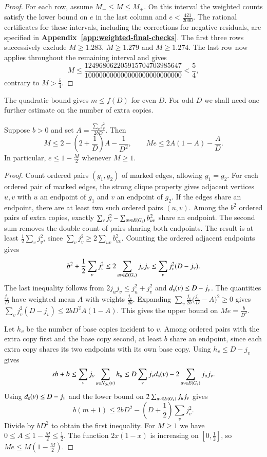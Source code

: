 \begin{proof}
For each row, assume $M_-\leq M\leq M_+$. On this interval the
weighted counts satisfy the lower bound on $e$ in the last column
and $e<\frac{421}{2000}$. The rational certificates for these
intervals, including the corrections for negative residuals, are
specified in \textbf{Appendix~\ref{app:weighted-final-checks}}. The first three
rows successively exclude $M\geq1.283$, $M\geq1.279$ and
$M\geq1.274$. The last row now applies throughout the remaining
interval and gives
\[
 M\leq\frac{124968062205915704703985647}
                 {100000000000000000000000000}<\frac54,
\]
contrary to $M>\frac54$.
\end{proof}

The quadratic bound gives $m\leq f(D)$ for even $D$. For odd $D$
we shall need one further estimate on the number of extra copies.

\begin{lemma}\label{lem:multi-extra}
Suppose $b>0$ and set $A=\frac{\sum_v j_v^2}{2bD}$. Then
\[
 M\le 2-\left(2+\frac{1}{D}\right)A-\frac{1}{D^2},
 \qquad
 Me\le 2A(1-A)-\frac{A}{D}.
\]
In particular, $e\le 1-\frac{M}{2}$ whenever $M\ge1$.
\end{lemma}

\begin{proof}
Count ordered pairs $(g_1,g_2)$ of marked edges, allowing $g_1=g_2$.
For each ordered pair of marked edges, the strong clique property gives adjacent vertices
$u,v$ with $u$ an endpoint of $g_1$ and $v$ an endpoint of $g_2$.
If the edges share an endpoint, there are at least two
such ordered pairs $(u,v)$. Among the $b^2$ ordered pairs of extra copies,
exactly $\sum_v j_v^2-\sum_{uv\in E(G_{\rm s})}b_{uv}^2$ share an
endpoint. The second sum removes the
double count of pairs sharing both endpoints. The result is at least
$\frac{1}{2}\sum_v j_v^2$, since $\sum_v j_v^2\ge2\sum_{uv}b_{uv}^2$.
Counting the ordered adjacent endpoints gives
\[
 b^2+\frac{1}{2}\sum_v j_v^2
 \le 2\sum_{uv\in E(G_{\rm s})}j_uj_v
 \le \sum_v j_v^2(D-j_v).
\]
The last inequality follows from $2j_uj_v\le j_u^2+j_v^2$ and
$d_{\rm s}(v)\le D-j_v$. The quantities $\frac{j_v}{D}$ have
weighted mean $A$ with weights $\frac{j_v}{2b}$. Expanding
$\sum_v \frac{j_v}{2b}\bigl(\frac{j_v}{D}-A\bigr)^2\geq0$
gives $\sum_v j_v^2(D-j_v)\le 2bD^2A(1-A)$.
This gives the upper bound on $Me=\frac{b}{D^2}$.

Let $h_v$ be the number of base copies incident to $v$. Among ordered pairs
with the extra copy first and the base copy second, at least
$b$ share an endpoint, since each extra copy shares its two
endpoints with its own base copy. Using $h_v\le D-j_v$ gives
\[
 sb+b\le \sum_v j_v\sum_{u\in N_{G_{\rm s}}(v)} h_u
 \le D\sum_v j_v d_{\rm s}(v)-2\sum_{uv\in E(G_{\rm s})}j_uj_v.
\]
Using $d_{\rm s}(v)\le D-j_v$ and the lower bound on
$2\sum_{uv\in E(G_{\rm s})}j_uj_v$ gives
\[
 b(m+1)\le 2bD^2-\left(D+\frac{1}{2}\right)\sum_v j_v^2.
\]
Divide by $bD^2$ to obtain the first inequality. For $M\ge1$ we
have $0\le A\le 1-\frac{M}{2}\le\frac{1}{2}$. The function $2x(1-x)$ is
increasing on $[0,\frac{1}{2}]$, so $Me\le M(1-\frac{M}{2})$.
\end{proof}


